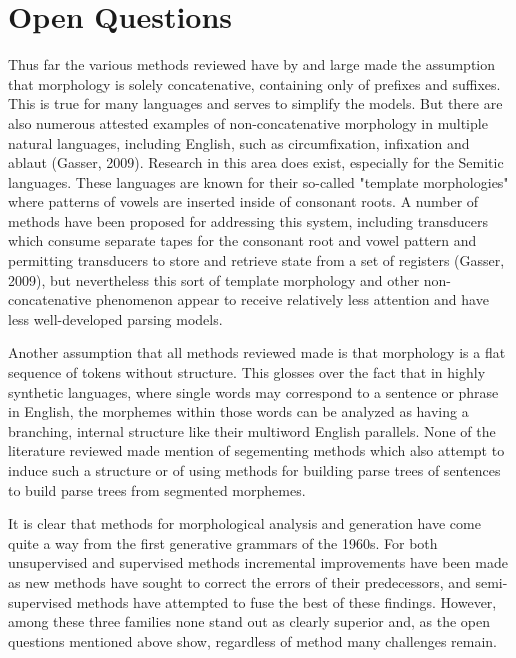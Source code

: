 \documentclass[12pt]{article}
\begin{document}
\section{Open Questions}
Thus far the various methods reviewed have by and large made the assumption that morphology is solely concatenative, containing only of prefixes and suffixes. This is true for many languages and serves to simplify the models. But there are also numerous attested examples of non-concatenative morphology in multiple natural languages, including English, such as circumfixation, infixation and ablaut (Gasser, 2009). Research in this area does exist, especially for the Semitic languages. These languages are known for their so-called "template morphologies" where patterns of vowels are inserted inside of consonant roots. A number of methods have been proposed for addressing this system, including transducers which consume separate tapes for the consonant root and vowel pattern and permitting transducers to store and retrieve state from a set of registers (Gasser, 2009), but nevertheless this sort of template morphology and other non-concatenative phenomenon appear to receive relatively less attention and have less well-developed parsing models.

Another assumption that all methods reviewed made is that morphology is a flat sequence of tokens without structure. This glosses over the fact that in highly synthetic languages, where single words may correspond to a sentence or phrase in English, the morphemes within those words can be analyzed as having a branching, internal structure like their multiword English parallels. None of the literature reviewed made mention of segementing methods which also attempt to induce such a structure or of using methods for building parse trees of sentences to build parse trees from segmented morphemes.

It is clear that methods for morphological analysis and generation have come quite a way from the first generative grammars of the 1960s. For both unsupervised and supervised methods incremental improvements have been made as new methods have sought to correct the errors of their predecessors, and semi-supervised methods have attempted to fuse the best of these findings. However, among these three families none stand out as clearly superior and, as the open questions mentioned above show, regardless of method many challenges remain.
\end{document}
